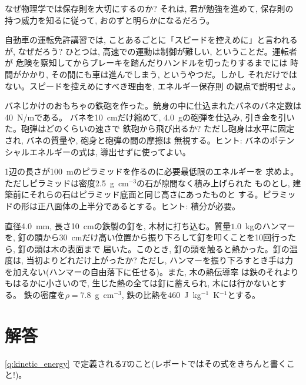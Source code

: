 なぜ物理学では保存則を大切にするのか? それは, 君が勉強を進めて, 保存則の
持つ威力を知るに従って, おのずと明らかになるだろう。\mv

\begin{q}\label{q:drive_speed} 自動車の運転免許講習では, 
ことあるごとに「スピードを控えめに」と言われるが, なぜだろう? 
ひとつは, 高速での運動は制御が難しい, ということだ。運転者が
危険を察知してからブレーキを踏んだりハンドルを切ったりするまでには
時間がかかり, その間にも車は進んでしまう, というやつだ。しかし
それだけではない。スピードを控えめにすべき理由を, エネルギー保存則
の観点で説明せよ。\end{q}
\hv

\begin{exq} バネじかけのおもちゃの鉄砲を作った。銃身の中に仕込まれたバネのバネ定数は40~N/mである。
バネを10~cmだけ縮めて, 4.0~gの砲弾を仕込み, 引き金を引いた。砲弾はどのくらいの速さで
鉄砲から飛び出るか? ただし砲身は水平に固定され, バネの質量や, 砲身と砲弾の間の摩擦は
無視する。ヒント: バネのポテンシャルエネルギーの式は, 導出せずに使ってよい。\end{exq}

\begin{exq} 1辺の長さが100~mのピラミッドを作るのに必要最低限のエネルギーを
求めよ。ただしピラミッドは密度2.5~g~cm$^{-3}$の石が隙間なく積み上げられた
ものとし, 建築前にそれらの石はピラミッド底面と同じ高さにあったものと
する。ピラミッドの形は正八面体の上半分であるとする。ヒント: 積分が必要。\end{exq}

\begin{exq} 直径4.0~mm, 長さ10~cmの鉄製の釘を, 木材に打ち込む。質量$1.0$~kgのハンマーを, 
釘の頭から30~cmだけ高い位置から振り下ろして釘を叩くことを10回行ったら, 釘の頭は木の表面まで
届いた。このとき, 釘の頭を触ると熱かった。釘の温度は, 当初よりどれだけ上がったか? ただし, 
ハンマーを振り下ろすとき手は力を加えない(ハンマーの自由落下に任せる)。また, 木の熱伝導率
は鉄のそれよりもはるかに小さいので, 生じた熱の全ては釘に蓄えられ, 木には行かないとする。
鉄の密度を$\rho=7.8$~g~cm$^{-3}$, 鉄の比熱を460~J~kg$^{-1}$~K$^{-1}$とする。\end{exq}

\section{解答}
\ref{q:kinetic_energy}
で定義される$T$のこと(レポートではその式をきちんと書くこと!)。
\vspace{0.4cm}

